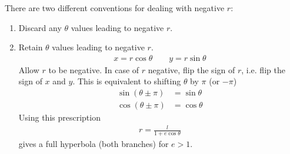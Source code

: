 There are two different conventions for dealing with negative $r$:
\begin{enumerate}
\item
Discard any $\theta$ values leading to negative $r$.
\item
Retain $\theta$ values leading to negative $r$.
\begin{align*}
x = r \cos \theta \qquad y = r \sin \theta
\end{align*}
Allow $r$ to be negative. In case of $r$ negative, flip the sign of $r$, i.e. flip the sign of $x$ and $y$. This is equivalent to shifting $\theta$ by $\pi$ (or $-\pi$)
\begin{align*}
\sin(\theta \pm \pi) & = \sin \theta \\
\cos(\theta \pm \pi) & = \cos \theta
\end{align*}
Using this prescription
\begin{align*}
r = \frac l {1+ e \cos \theta}
\end{align*}
gives a full hyperbola (both branches) for $e>1$.
\end{enumerate}



